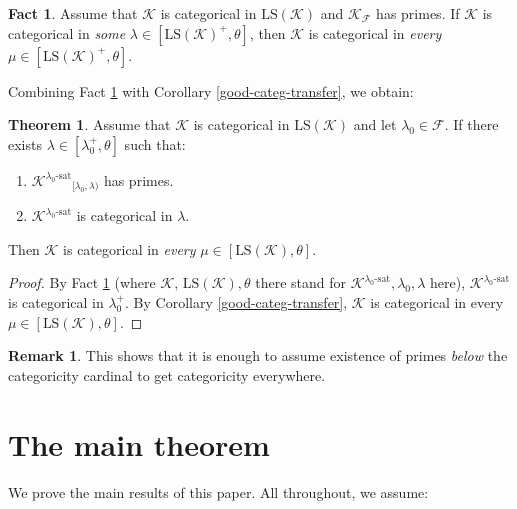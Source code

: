 \documentclass[12pt]{amsart}
\theoremstyle{definition}
\newtheorem{thm}[mydef]{Theorem}
\newtheorem{remark}[mydef]{Remark}
\newtheorem{fact}[mydef]{Fact}
\begin{document}
\begin{fact}\label{prime-transfer-frame}
  Assume that ${\mathcal{K}}$ is categorical in ${\text{LS}} ({\mathcal{K}})$ and ${\mathcal{K}}_{\mathcal{F}}$ has primes. If ${\mathcal{K}}$ is categorical in \emph{some} $\lambda \in [{\text{LS}} ({\mathcal{K}})^+, \theta]$, then ${\mathcal{K}}$ is categorical in \emph{every} $\mu \in [{\text{LS}} ({\mathcal{K}})^+, \theta]$.
\end{fact}

Combining Fact \ref{prime-transfer-frame} with Corollary \ref{good-categ-transfer}, we obtain:

\begin{thm}\label{prime-transfer-frame-2}
  Assume that ${\mathcal{K}}$ is categorical in ${\text{LS}} ({\mathcal{K}})$ and let $\lambda_0 \in {\mathcal{F}}$. If there exists $\lambda \in [\lambda_0^+, \theta]$ such that:
  \begin{enumerate}
    \item ${{{{\mathcal{K}}}^{{{\lambda_0}}\text{-sat}}}}_{[\lambda_0, \lambda)}$ has primes. 
    \item ${{{{\mathcal{K}}}^{{{\lambda_0}}\text{-sat}}}}$ is categorical in $\lambda$.
  \end{enumerate}

  Then ${\mathcal{K}}$ is categorical in \emph{every} $\mu \in [{\text{LS}} ({\mathcal{K}}), \theta]$.
\end{thm}
\begin{proof}
  By Fact \ref{prime-transfer-frame} (where ${\mathcal{K}}$, ${\text{LS}} ({\mathcal{K}}), \theta$ there stand for ${{{{\mathcal{K}}}^{{{\lambda_0}}\text{-sat}}}}, \lambda_0, \lambda$ here), ${{{{\mathcal{K}}}^{{{\lambda_0}}\text{-sat}}}}$ is categorical in $\lambda_0^+$. By Corollary \ref{good-categ-transfer}, ${\mathcal{K}}$ is categorical in every $\mu \in [{\text{LS}} ({\mathcal{K}}), \theta]$.
\end{proof}
\begin{remark}
  This shows that it is enough to assume existence of primes \emph{below} the categoricity cardinal to get categoricity everywhere.
\end{remark}

\section{The main theorem}\label{main-thm-sec}

We prove the main results of this paper. All throughout, we assume:
\end{document}
